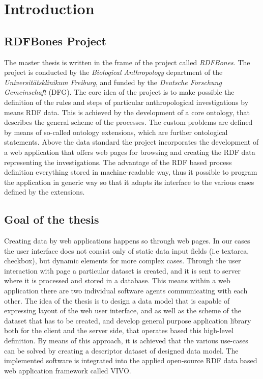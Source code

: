 \chapter{Introduction}


\section{RDFBones Project}

The master thesis is written in the frame of the project called \textit{RDFBones}. The project is conducted by the \textit{Biological Anthropology} department of the \textit{Universitätsklinikum Freiburg}, and funded by the \textit{Deutsche Forschung Gemeinschaft} (DFG). The core idea of the project is to make possible the definition of the rules and steps of particular anthropological investigations by means RDF data. This is achieved by the development of a core ontology, that describes the general scheme of the processes. The custom problems are defined by means of so-called ontology extensions, which are further ontological statements. Above the data standard the project incorporates the development of a web application that offers web pages for browsing and creating the RDF data representing the investigations. The advantage of the RDF based process definition everything stored in 
machine-readable way, thus it possible to program the application in generic way so that it adapts its interface to the various cases defined by the extensions.

\section{Goal of the thesis}

Creating data by web applications happens so through web pages. In our cases the user interface does not consist only of static data input fields (i.e textarea, checkbox), but dynamic elements for more complex cases. Through the user interaction with page a particular dataset is created, and it is sent to server where it is processed and stored in a database. This means within a web application there are two individual software agents communicating with each other. The idea of the thesis is to design a data model that is capable of expressing layout of the web user interface, and as well as the scheme of the dataset that has to be created, and develop general purpose application library both for the client and the server side, that operates based this high-level definition. By means of this approach, it is achieved that the various use-cases can be solved by creating a descriptor dataset of designed data model. The implemented software is integrated into the applied open-source RDF data based web application framework called VIVO.

